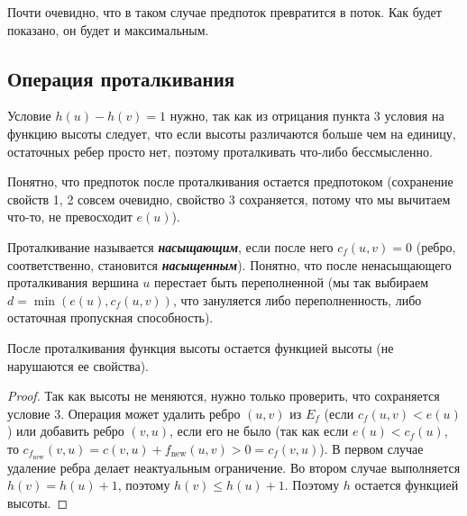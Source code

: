 Почти очевидно, что в таком случае предпоток превратится в поток. Как будет показано, он будет и максимальным.

\subsection{Операция проталкивания}

\begin{algorithm}
\DontPrintSemicolon
{}
\end{algorithm}
Условие $h(u)-h(v)=1$ нужно, так как из отрицания пункта 3 условия на функцию высоты следует, что если высоты различаются больше чем на единицу, остаточных ребер просто нет, поэтому проталкивать что-либо бессмысленно.

Понятно, что предпоток после проталкивания остается предпотоком (сохранение свойств 1, 2 совсем очевидно, свойство 3 сохраняется, потому что мы вычитаем что-то, не превосходит $e(u)$\label{someshit7}).

Проталкивание называется {\bf\it насыщающим}, если после него $c_f(u,v)=0$ (ребро, соответственно, становится {\bf\it насыщенным}). Понятно, что после ненасыщающего проталкивания вершина $u$ перестает быть переполненной (мы так выбираем $d=\min(e(u), c_f(u,v))$, что зануляется либо переполненность, либо остаточная пропускная способность).

\begin{lemma}
	После проталкивания функция высоты остается функцией высоты (не нарушаются ее свойства).
\end{lemma}
\begin{proof}
	Так как высоты не меняются, нужно только проверить, что сохраняется условие 3. Операция может удалить ребро $(u,v)$ из $E_f$ (если $c_f(u,v)<e(u)$) или добавить ребро $(v,u)$, если его не было (так как если $e(u)<c_f(u)$, то $c_{f_\mathrm{new}}(v,u)=c(v,u)+f_\mathrm{new}(u,v)>0=c_f(v,u)$). В первом случае удаление ребра делает неактуальным ограничение. Во втором случае выполняется $h(v)=h(u)+1$, поэтому $h(v)\le h(u)+1$. Поэтому $h$ остается функцией высоты.
\end{proof}

